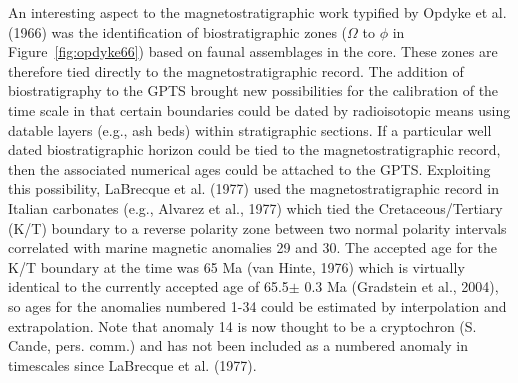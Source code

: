  An interesting aspect to the magnetostratigraphic work typified by Opdyke et al. (1966) was the identification of biostratigraphic zones ($\Omega$ to $\phi$ in Figure~\ref{fig:opdyke66})  based on faunal assemblages in the core. These zones are therefore tied directly to the magnetostratigraphic record.     The addition of biostratigraphy to the GPTS  brought new possibilities for the calibration of the time scale in that certain boundaries could  be dated by radioisotopic means using datable layers (e.g., ash beds) within stratigraphic sections.  If a particular well dated biostratigraphic horizon could be tied to the magnetostratigraphic record, then the associated  numerical ages could be attached to the GPTS.     Exploiting this possibility, 
 LaBrecque et al. (1977) \nocite{labrecque77} used the magnetostratigraphic record  in Italian carbonates  (e.g., 
 Alvarez et al., 1977) \nocite{alvarez77}  which tied the Cretaceous/Tertiary (K/T) boundary to a reverse polarity zone between two normal polarity intervals correlated with marine magnetic anomalies 29 and 30.  The accepted age for the K/T boundary at the time was 65 Ma 
 (van Hinte, 1976) \nocite{vanhinte76} which is virtually identical to the currently accepted age of 65.5$\pm$ 0.3 Ma 
 (Gradstein et al., 2004), so ages for the anomalies numbered 1-34 could be estimated by interpolation and extrapolation.  Note that anomaly 14 is now thought to be a cryptochron (S. Cande, pers. comm.) and has not been included as a numbered anomaly in timescales since 
 LaBrecque et al. (1977).   



